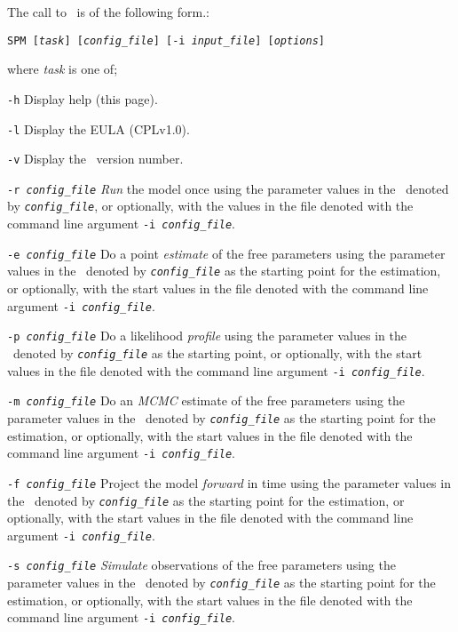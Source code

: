 The call to \SPM\ is of the following form.: 

\texttt{SPM [\emph{task}] [\emph{config\_file}] [-i \emph{input\_file}] [\emph{options}]}

where \emph{task} is one of;
\begin{description}
\item \texttt{-h} Display help (this page).

\item \texttt{-l} Display the EULA (CPLv1.0).

\item \texttt{-v} Display the \SPM\ version number.

\item \texttt{-r \emph{config\_file}} \emph{Run} the model once using the parameter values in the \config\ denoted by \emph{\texttt{config\_file}}, or optionally, with the values in the file denoted with the command line argument \texttt{-i \emph{config\_file}}.

\item \texttt{-e \emph{config\_file}} Do a point \emph{estimate} of the free parameters using the parameter values in the \config\ denoted by \emph{\texttt{config\_file}} as the starting point for the estimation, or optionally, with the start values in the file denoted with the command line argument \texttt{-i \emph{config\_file}}.

\item \texttt{-p \emph{config\_file}} Do a likelihood \emph{profile} using the parameter values in the \config\ denoted by \emph{\texttt{config\_file}} as the starting point, or optionally, with the start values in the file denoted with the command line argument \texttt{-i \emph{config\_file}}.

\item \texttt{-m \emph{config\_file}} Do an \emph{MCMC} estimate of the free parameters using the parameter values in the \config\ denoted by \emph{\texttt{config\_file}} as the starting point for the estimation, or optionally, with the start values in the file denoted with the command line argument \texttt{-i \emph{config\_file}}.

\item \texttt{-f \emph{config\_file}} Project the model \emph{forward} in time using the parameter values in the \config\ denoted by \emph{\texttt{config\_file}} as the starting point for the estimation, or optionally, with the start values in the file denoted with the command line argument \texttt{-i \emph{config\_file}}.

\item \texttt{-s \emph{config\_file}} \emph{Simulate} observations of the free parameters using the parameter values in the \config\ denoted by \emph{\texttt{config\_file}} as the starting point for the estimation, or optionally, with the start values in the file denoted with the command line argument \texttt{-i \emph{config\_file}}.

\end{description}

